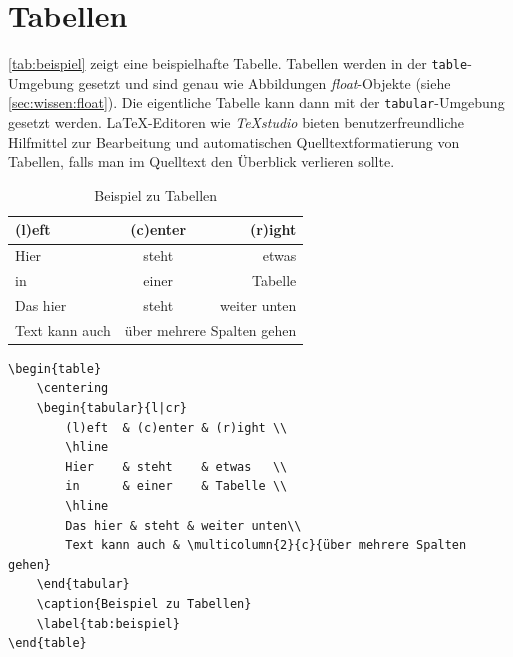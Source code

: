 	\section{Tabellen}
		\autoref{tab:beispiel} zeigt eine beispielhafte Tabelle.
		Tabellen werden in der \lstinline[language=thesis-latexbeispiel]|table|-Umgebung gesetzt und sind genau wie Abbildungen \emph{float}-Objekte (siehe \autoref{sec:wissen:float}).
		Die eigentliche Tabelle kann dann \zb{} mit der \lstinline[language=thesis-latexbeispiel]|tabular|-Umgebung gesetzt werden.
		\LaTeX-Editoren wie \emph{TeXstudio} bieten benutzerfreundliche Hilfmittel zur Bearbeitung und automatischen Quelltextformatierung von Tabellen, falls man im Quelltext den Überblick verlieren sollte.
		\begin{table}[bh]
			\centering
			\begin{vorlagenbeispiel}
				\begin{tabular}{l|cr} %
					(l)eft  & (c)enter & (r)ight \\ %
					\hline                          %
					Hier    & steht    & etwas   \\
					in      & einer    & Tabelle \\
					\hline
					Das hier & steht & weiter unten\\
					Text kann auch & \multicolumn{2}{c}{über mehrere Spalten gehen}
				\end{tabular}
			\end{vorlagenbeispiel}
			\caption{Beispiel zu Tabellen}
			\label{tab:beispiel}
		\end{table}
		\begin{lstlisting}[language=thesis-latexbeispiel]
\begin{table}
	\centering
	\begin{tabular}{l|cr}
		(l)eft  & (c)enter & (r)ight \\
		\hline                         
		Hier    & steht    & etwas   \\
		in      & einer    & Tabelle \\
		\hline
		Das hier & steht & weiter unten\\
		Text kann auch & \multicolumn{2}{c}{über mehrere Spalten gehen}
	\end{tabular}
	\caption{Beispiel zu Tabellen}
	\label{tab:beispiel}
\end{table}
		\end{lstlisting}
		
